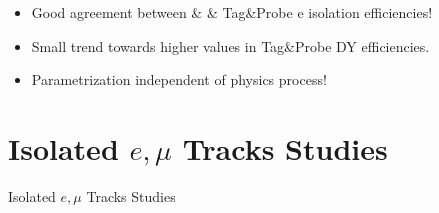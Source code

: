 \documentclass{beamer}
\begin{document}
\begin{frame}
\begin{columns}
\begin{column}{0.33\textwidth}
   \end{column}
  \end{columns}
\begin{itemize}
 \item Good agreement between \ttbar \& \wpj \& Tag\&Probe e isolation efficiencies!
 \item Small trend towards higher values in Tag\&Probe DY efficiencies.
 \item Parametrization independent of physics process!
\end{itemize}

\end{frame}
\section{Isolated $e,\mu$ Tracks Studies}
\begin{frame}
 \begin{block}{}
 \centering
 \Large Isolated $e,\mu$ Tracks Studies
 \end{block}
\end{frame}
\end{document}
